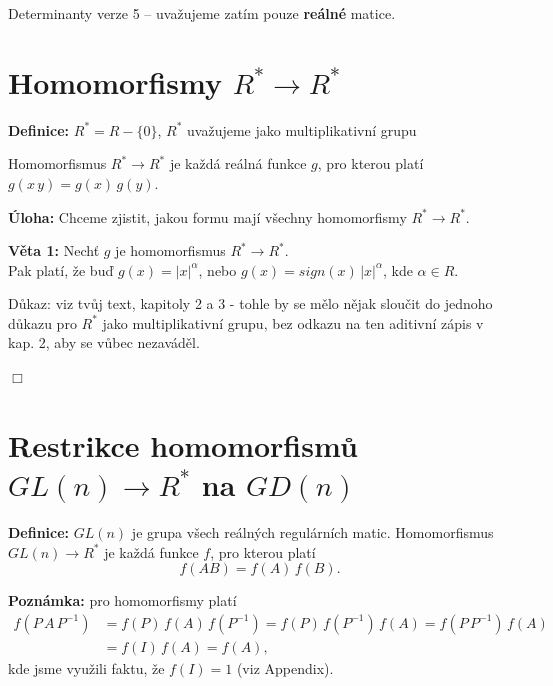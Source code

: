 \documentclass[12pt]{article}
\begin{document}
{\Large{Determinanty  verze 5}} 
-- uvažujeme zatím pouze \textbf{reálné} matice.


{\section{Homomorfismy $R^* \rightarrow R^*$ }} 

\textbf{Definice:} $R^* = R - \{0\}$, $R^*$ uvažujeme jako multiplikativní grupu
\vspace{1mm}

Homomorfismus $R^* \rightarrow R^*$ je každá reálná funkce $g$, pro kterou platí $g(x\,y) = g(x)\,g(y)$. 
\vspace{4mm}

\textbf{Úloha:} Chceme zjistit, jakou formu mají všechny homomorfismy $R^* \rightarrow R^*$.
\vspace{2mm}

\textbf{Věta 1:} Nechť $g$ je homomorfismus $R^* \rightarrow R^*$. \\
Pak platí, že buď $g(x) = |x|^\alpha$, nebo $g(x) = sign(x)\,|x|^\alpha$, kde $\alpha \in R$.

\vspace{2mm}
Důkaz: viz tvůj text, kapitoly 2  a 3 - tohle by se mělo nějak sloučit do jednoho důkazu pro $R^*$ jako multiplikativní grupu, bez odkazu na ten aditivní zápis v kap. 2, aby se vůbec nezaváděl.

$\Box$
\vspace{5mm}


{\section{Restrikce homomorfismů $GL(n) \rightarrow R^*$ na $GD(n)$}} 

\textbf{Definice:} 
\vspace{1mm}
$GL(n)$ je grupa všech reálných regulárních matic.
\vspace{1mm}
Homomorfismus $GL(n) \rightarrow R^*$ je každá funkce $f$, pro kterou platí \begin{equation}
f(AB) = f(A)\,f(B) .
\end{equation}

\textbf{Poznámka:} pro homomorfismy platí 
\begin{align*}
f(P\,A\,P^{-1}) &= f(P)\,f(A)\,f(P^{-1}) = f(P)\,f(P^{-1})\,f(A)=f(P\,P^{-1})\,f(A) \\
  &=  f(I)\,f(A) = f(A),
\end{align*}
kde jsme využili faktu, že $f(I)=1$ (viz Appendix).
\end{document}
